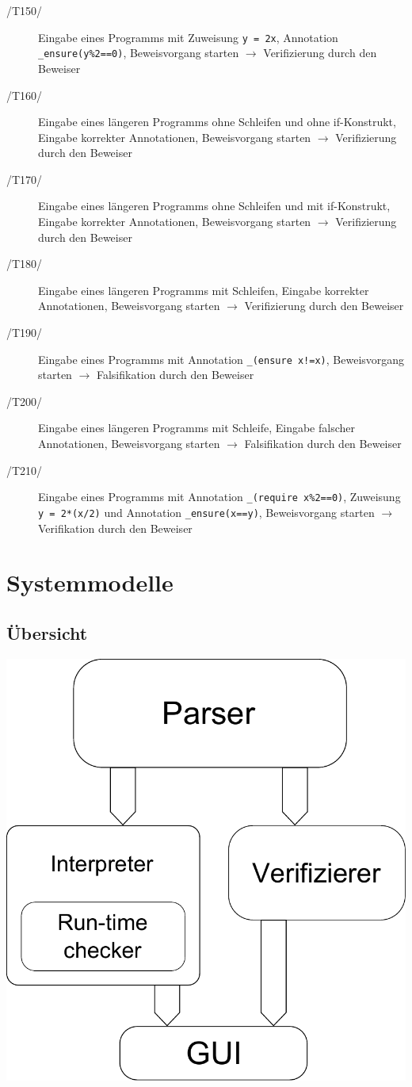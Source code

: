 \documentclass[a4paper,10pt]{article}
\begin{document}
\begin{description}
\item[/T150/] Eingabe eines Programms mit Zuweisung \texttt{y = 2x}, Annotation \texttt{\_ensure(y\%2==0)}, Beweisvorgang starten $\to$ Verifizierung durch den Beweiser
\item[/T160/] Eingabe eines längeren Programms ohne Schleifen und ohne if-Konstrukt, Eingabe korrekter Annotationen, Beweisvorgang starten $\to$ Verifizierung durch den Beweiser
\item[/T170/] Eingabe eines längeren Programms ohne Schleifen und mit if-Konstrukt, Eingabe korrekter Annotationen, Beweisvorgang starten $\to$ Verifizierung durch den Beweiser
\item[/T180/] Eingabe eines längeren Programms mit Schleifen, Eingabe korrekter Annotationen, Beweisvorgang starten $\to$ Verifizierung durch den Beweiser
\item[/T190/] Eingabe eines Programms mit Annotation \texttt{\_(ensure x!=x)}, Beweisvorgang starten $\to$ Falsifikation durch den Beweiser
\item[/T200/] Eingabe eines längeren Programms mit Schleife, Eingabe falscher Annotationen, Beweisvorgang starten $\to$ Falsifikation durch den Beweiser
\item[/T210/] Eingabe eines Programms mit Annotation \texttt{\_(require x\%2==0)}, Zuweisung \texttt{y = 2*(x/2)} und Annotation \texttt{\_ensure(x==y)}, Beweisvorgang starten $\to$ Verifikation durch den Beweiser
\end{description}

\section{Systemmodelle}
\subsection{Übersicht}
\includegraphics{systemmodelle.pdf}
\end{document}
